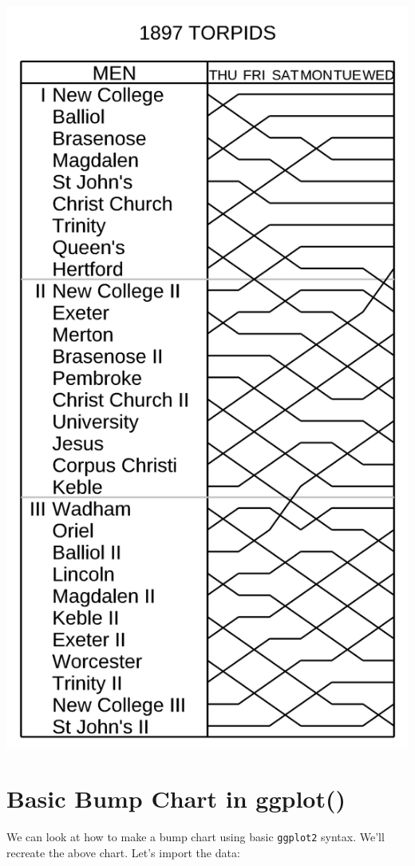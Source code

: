\documentclass[
  letterpaper,
  DIV=11,
  numbers=noendperiod]{scrreprt}
\begin{document}
\includegraphics{./img/bumps.png}

\hypertarget{basic-bump-chart-in-ggplot}{%
\section{Basic Bump Chart in
ggplot()}\label{basic-bump-chart-in-ggplot}}

We can look at how to make a bump chart using basic \texttt{ggplot2}
syntax. We'll recreate the above chart. Let's import the data:
\end{document}
